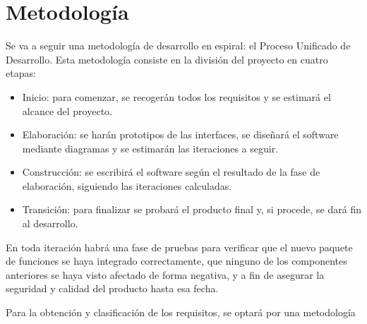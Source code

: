 \chapter{Metodología}
\label{cap:MiMetodologia}


Se va a seguir una metodología de desarrollo en espiral: el Proceso Unificado de Desarrollo. Esta metodología consiste en la división del proyecto en cuatro etapas:
\begin{itemize}
    \item Inicio: para comenzar, se recogerán todos los requisitos y se estimará el alcance del proyecto.
    \item Elaboración: se harán prototipos de las interfaces, se diseñará el software mediante diagramas y se estimarán las iteraciones a seguir.
    \item Construcción: se escribirá el software según el resultado de la fase de elaboración, siguiendo las iteraciones calculadas. 
    \item Transición: para finalizar se probará el producto final y, si procede, se dará fin al desarrollo.
\end{itemize}
En toda iteración habrá una fase de pruebas para verificar que el nuevo paquete de funciones se haya integrado correctamente, que ninguno de los componentes anteriores se haya visto afectado de forma negativa, y a fin de asegurar la seguridad y calidad del producto hasta esa fecha.

Para la obtención y clasificación de los requisitos, se optará por una metodología 

